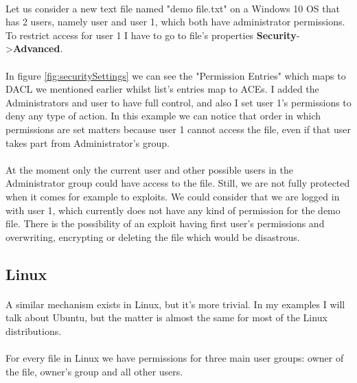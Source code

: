 	\paragraph{}
	Let us consider a new text file named "demo file.txt" on a Windows 10 OS that has 2 users, namely user and user 1, which both have administrator permissions. To restrict access for user 1 I have to go to file's properties \textbf{Security}-\textgreater\textbf{Advanced}.
	
	\paragraph{}
	In figure \ref{fig:securitySettings} we can see the "Permission Entries" which maps to DACL we mentioned earlier whilst list's entries map to ACEs. I added the Administrators and user to have full control, and also I set user 1's permissions to deny any type of action. In this example we can notice that order in which permissions are set matters because user 1 cannot access the file, even if that user takes part from Administrator's group. 
	
	\paragraph{}
	At the moment only the current user and other possible users in the Administrator group could have access to the file. Still, we are not fully protected when it comes for example to exploits. We could consider that we are logged in with user 1, which currently does not have any kind of permission for the demo file. There is the possibility of an exploit having first user's permissions and overwriting, encrypting or deleting the file which would be disastrous.
	
	\subsection{Linux}
	\paragraph{}
	A similar mechanism exists in Linux, but it's more trivial. In my examples I will talk about Ubuntu, but the matter is almost the same for most of the Linux distributions.
	
	\paragraph{}
	For every file in Linux we have permissions for three main user groups: owner of the file, owner's group and all other users. 
	
